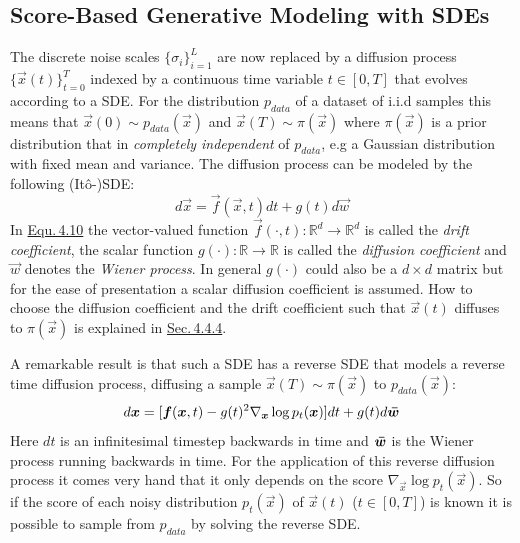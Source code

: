 \subsection{Score-Based Generative Modeling with SDEs} \label{sec:4.4.1}
The discrete noise scales $\{\sigma_i\}_{i=1}^L$ are now replaced by a diffusion process $\{\vec{x}(t)\}_{t=0}^T$ indexed by a continuous time variable $t\in[0,T]$ that evolves according to a SDE. For the distribution $p_{data}$ of a dataset of i.i.d samples this means that $\vec{x}(0)\sim p_{data}(\vec{x})$ and $\vec{x}(T)\sim \pi(\vec{x})$ where $\pi(\vec{x})$ is a prior distribution that in \textit{completely independent} of $p_{data}$, e.g a Gaussian distribution with fixed mean and variance. The diffusion process can be modeled by the following (Itô-)SDE:
%
\begin{equation} \label{equ:4.10}
    d\vec{x}=\vec{f}(\vec{x},t)dt+g(t)d\vec{w}
\end{equation}
%
In \hyperref[equ:4.10]{Equ.\,4.10} the vector-valued function $\vec{f}(\cdot,t):\mathbb{R}^d\rightarrow\mathbb{R}^d$ is called the \textit{drift coefficient}, the scalar function $g(\cdot):\mathbb{R}\rightarrow\mathbb{R}$ is called the \textit{diffusion coefficient} and $\vec{w}$ denotes the \textit{Wiener process}. In general $g(\cdot)$ could also be a $d\times d$ matrix but for the ease of presentation a scalar diffusion coefficient is assumed. How to choose the diffusion coefficient and the drift coefficient such that $\vec{x}(t)$ diffuses to $\pi(\vec{x})$ is explained in \hyperref[sec:4.4.4]{Sec.\,4.4.4}.

A remarkable result \cite{ANDERSON} is that such a SDE has a reverse SDE that models a reverse time diffusion process, diffusing a sample $\vec{x}(T)\sim\pi(\vec{x})$ to $p_{data}(\vec{x})$:
%
\begin{equation} \label{equ:4.11}
    d\vec{x}=[\vec{f}(\vec{x},t)-g(t)^2\nabla_{\vec{x}}\log p_t(\vec{x})]dt+g(t)d\vec{\Bar{w}}
\end{equation}
%
Here $dt$ is an infinitesimal timestep backwards in time and $\vec{\Bar{w}}$ is the Wiener process running backwards in time. For the application of this reverse diffusion process it comes very hand that it only depends on the score $\nabla_{\vec{x}}\log p_t(\vec{x})$. So if the score of each noisy distribution $p_t(\vec{x})$ of $\vec{x}(t)$ ($t\in[0, T]$) is known it is possible to sample from $p_{data}$ by solving the reverse SDE.
%
